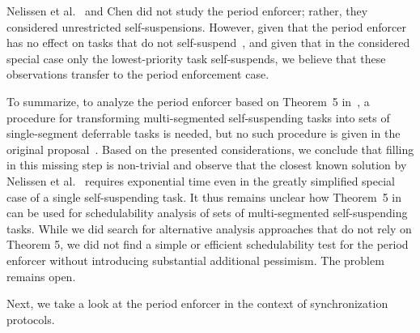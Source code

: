Nelissen et al.~\cite{ecrts15nelissen} and Chen \cite{RTSS2016-suspension} did not study the period enforcer; rather, they considered unrestricted self-suspensions. However, given that the period enforcer has no effect on tasks that do not self-suspend~\cite{Raj:suspension1991}, and given that in the considered special case only the lowest-priority task self-suspends, we believe that these observations transfer to the period enforcement case.

To summarize, to analyze the period enforcer based on Theorem~5 in~\cite{Raj:suspension1991}, a procedure for transforming multi-segmented self-suspending tasks into sets of single-segment deferrable tasks is needed, but no such procedure is given in the original proposal~\cite{Raj:suspension1991}.
%
Based on the presented considerations, we conclude that filling in this missing step is non-trivial and observe that the closest known solution by Nelissen et al.~\cite{ecrts15nelissen} requires exponential time even in the greatly simplified special case of a single self-suspending task. It thus remains unclear how Theorem~5 in~\cite{Raj:suspension1991} can be used for schedulability analysis of sets of multi-segmented self-suspending tasks. 
While we did search for alternative analysis approaches that do not rely on Theorem 5, we did not find a simple or efficient schedulability test for the period enforcer without introducing substantial additional pessimism.  The problem remains open. 

Next, we take a look at the period enforcer in the context of synchronization protocols.




